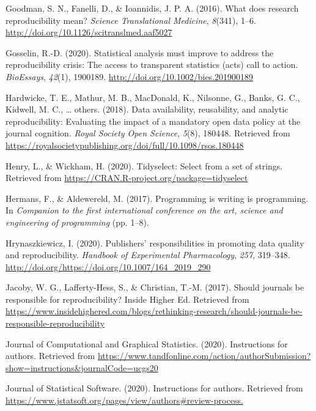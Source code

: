 \documentclass[12pt,twoside]{reedthesis}
\begin{document}
\hypertarget{ref-Goodman341ps12}{}
Goodman, S. N., Fanelli, D., \& Ioannidis, J. P. A. (2016). What does
research reproducibility mean? \emph{Science Translational Medicine},
\emph{8}(341), 1--6. \url{http://doi.org/10.1126/scitranslmed.aaf5027}

\hypertarget{ref-bioessays-gosselin}{}
Gosselin, R.-D. (2020). Statistical analysis must improve to address the
reproducibility crisis: The access to transparent statistics (acts) call
to action. \emph{BioEssays}, \emph{42}(1), 1900189.
\url{http://doi.org/10.1002/bies.201900189}

\hypertarget{ref-hardwicke2018data}{}
Hardwicke, T. E., Mathur, M. B., MacDonald, K., Nilsonne, G., Banks, G.
C., Kidwell, M. C., \ldots{} others. (2018). Data availability,
reusability, and analytic reproducibility: Evaluating the impact of a
mandatory open data policy at the journal cognition. \emph{Royal Society
Open Science}, \emph{5}(8), 180448. Retrieved from
\url{https://royalsocietypublishing.org/doi/full/10.1098/rsos.180448}

\hypertarget{ref-R-tidyselect}{}
Henry, L., \& Wickham, H. (2020). Tidyselect: Select from a set of
strings. Retrieved from
\url{https://CRAN.R-project.org/package=tidyselect}

\hypertarget{ref-hermans2017programming}{}
Hermans, F., \& Aldewereld, M. (2017). Programming is writing is
programming. In \emph{Companion to the first international conference on
the art, science and engineering of programming} (pp. 1--8).

\hypertarget{ref-hrynaszkiewicz2020publishers}{}
Hrynaszkiewicz, I. (2020). Publishers' responsibilities in promoting
data quality and reproducibility. \emph{Handbook of Experimental
Pharmacology}, \emph{257}, 319--348.
\url{http://doi.org/https://doi.org/10.1007/164_2019_290}

\hypertarget{ref-higher-ed}{}
Jacoby, W. G., Lafferty-Hess, S., \& Christian, T.-M. (2017). Should
journals be responsible for reproducibility? Inside Higher Ed. Retrieved
from
\url{https://www.insidehighered.com/blogs/rethinking-research/should-journals-be-responsible-reproducibility}

\hypertarget{ref-jcgs-guide}{}
Journal of Computational and Graphical Statistics. (2020). Instructions
for authors. Retrieved from
\url{https://www.tandfonline.com/action/authorSubmission?show=instructions\&journalCode=ucgs20}

\hypertarget{ref-jss-guide}{}
Journal of Statistical Software. (2020). Instructions for authors.
Retrieved from
\url{https://www.jstatsoft.org/pages/view/authors\#review-process.}
\end{document}

